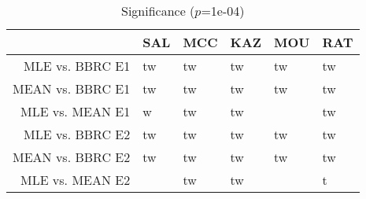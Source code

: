 \begin{table}[t]
\begin{center}
\begin{tabular}{rlllll}
  \hline
 & SAL & MCC & KAZ & MOU & RAT \\ 
  \hline
MLE vs. BBRC E1 & tw & tw & tw & tw & tw \\ 
  MEAN vs. BBRC E1 & tw & tw & tw & tw & tw \\ 
  MLE vs. MEAN E1 & w & tw & tw &  & tw \\ 
  MLE vs. BBRC E2 & tw & tw & tw & tw & tw \\ 
  MEAN vs. BBRC E2 & tw & tw & tw & tw & tw \\ 
  MLE vs. MEAN E2 &  & tw & tw &  & t \\ 
   \hline
\end{tabular}
\caption{Significance ($p$=1e-04)}
\label{t:sign}
\end{center}
\end{table}
